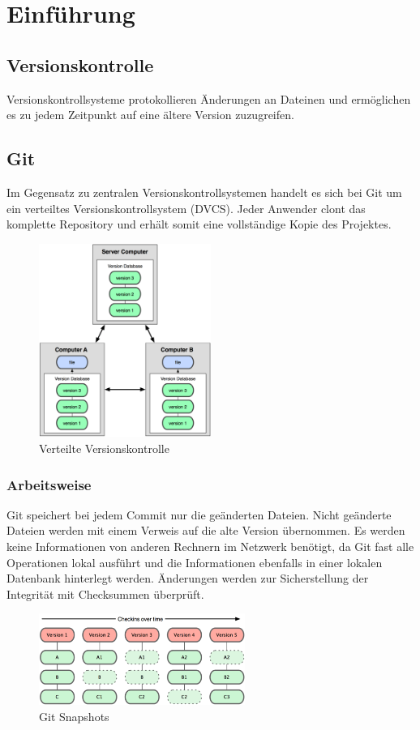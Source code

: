 \chapter{Einführung}
\section{Versionskontrolle}
Versionskontrollsysteme protokollieren Änderungen an Dateinen und ermöglichen es zu jedem Zeitpunkt auf eine ältere Version zuzugreifen.
\section{Git}
Im Gegensatz zu zentralen Versionskontrollsystemen handelt es sich bei Git um ein verteiltes Versionskontrollsystem (DVCS). Jeder Anwender clont das komplette Repository und erhält somit eine vollständige Kopie des Projektes.
\begin{figure}[ht]
	\centering
		\includegraphics[width=0.5\textwidth]{img/dvcs.png}
	\caption{Verteilte Versionskontrolle}
\end{figure}
\subsection{Arbeitsweise}
Git speichert bei jedem Commit nur die geänderten Dateien. Nicht geänderte Dateien werden mit einem Verweis auf die alte Version übernommen. Es werden keine Informationen von anderen Rechnern im Netzwerk benötigt, da Git fast alle Operationen lokal ausführt und die Informationen ebenfalls in einer lokalen Datenbank hinterlegt werden. Änderungen werden zur Sicherstellung der Integrität mit Check\-summen überprüft.
\begin{figure}[ht]
	\centering
		\includegraphics[width=0.6\textwidth]{img/snap.png}
	\caption{Git Snapshots}
\end{figure}
